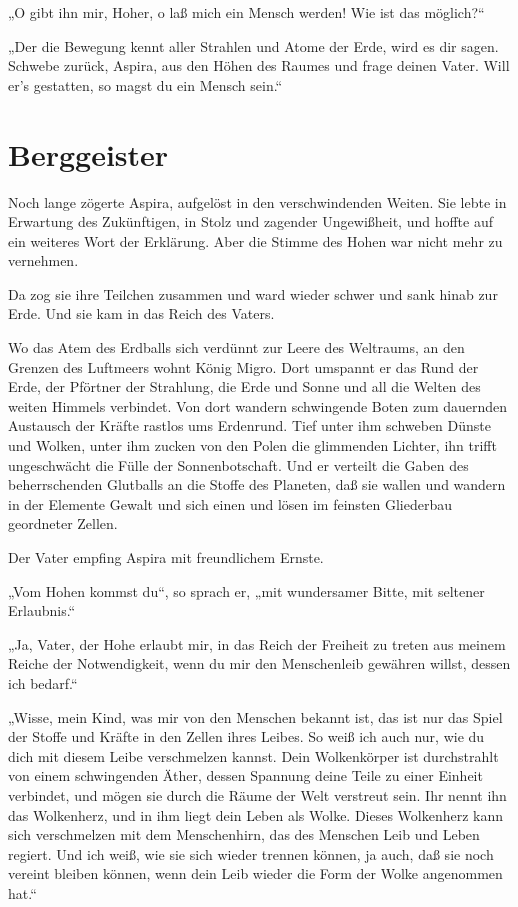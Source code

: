 „O gibt ihn mir, Hoher, o laß mich ein Mensch werden! Wie ist das
möglich?“

„Der die Bewegung kennt aller Strahlen und Atome der Erde, wird es
dir sagen. Schwebe zurück, Aspira, aus den Höhen des Raumes und
frage deinen Vater. Will er's gestatten, so magst du ein Mensch
sein.“

\section{Berggeister}

Noch lange zögerte Aspira, aufgelöst in den verschwindenden Weiten.
Sie lebte in Erwartung des Zukünftigen, in Stolz und zagender
Ungewißheit, und hoffte auf ein weiteres Wort der Erklärung. Aber
die Stimme des Hohen war nicht mehr zu vernehmen.

Da zog sie ihre Teilchen zusammen und ward wieder schwer und sank
hinab zur Erde. Und sie kam in das Reich des Vaters.

Wo das Atem des Erdballs sich verdünnt zur Leere des Weltraums, an
den Grenzen des Luftmeers wohnt König Migro. Dort umspannt er das
Rund der Erde, der Pförtner der Strahlung, die Erde und Sonne und
all die Welten des weiten Himmels verbindet. Von dort wandern
schwingende Boten zum dauernden Austausch der Kräfte rastlos ums
Erdenrund. Tief unter ihm schweben Dünste und Wolken, unter ihm
zucken von den Polen die glimmenden Lichter, ihn trifft
ungeschwächt die Fülle der Sonnenbotschaft. Und er verteilt die
Gaben des beherrschenden Glutballs an die Stoffe des Planeten, daß
sie wallen und wandern in der Elemente Gewalt und sich einen und
lösen im feinsten Gliederbau geordneter Zellen.

Der Vater empfing Aspira mit freundlichem Ernste.

„Vom Hohen kommst du“, so sprach er, „mit wundersamer Bitte, mit
seltener Erlaubnis.“

„Ja, Vater, der Hohe erlaubt mir, in das Reich der Freiheit zu
treten aus meinem Reiche der Notwendigkeit, wenn du mir den
Menschenleib gewähren willst, dessen ich bedarf.“

„Wisse, mein Kind, was mir von den Menschen bekannt ist, das ist
nur das Spiel der Stoffe und Kräfte in den Zellen ihres Leibes. So
weiß ich auch nur, wie du dich mit diesem Leibe verschmelzen
kannst. Dein Wolkenkörper ist durchstrahlt von einem schwingenden
Äther, dessen Spannung deine Teile zu einer Einheit verbindet, und
mögen sie durch die Räume der Welt verstreut sein. Ihr nennt ihn
das Wolkenherz, und in ihm liegt dein Leben als Wolke. Dieses
Wolkenherz kann sich verschmelzen mit dem Menschenhirn, das des
Menschen Leib und Leben regiert. Und ich weiß, wie sie sich wieder
trennen können, ja auch, daß sie noch vereint bleiben können, wenn
dein Leib wieder die Form der Wolke angenommen hat.“


